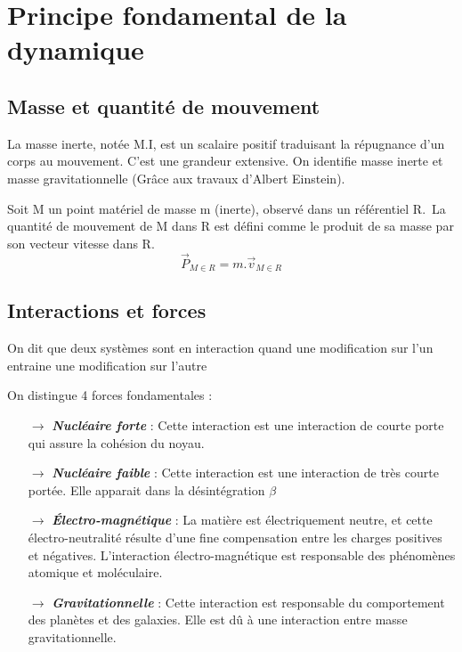 \chapter{Principe fondamental de la dynamique}

\section{Masse et quantité de mouvement}

\begin{de}
La masse inerte, notée M.I, est un scalaire positif traduisant la répugnance d'un corps au mouvement.
C'est une grandeur extensive. On identifie masse inerte et masse gravitationnelle (Grâce aux travaux d'Albert Einstein).
\end{de}

\begin{de}
Soit M un point matériel de masse m (inerte), observé dans un référentiel R.\
La quantité de mouvement de M dans R est défini comme le produit de sa masse par son vecteur vitesse dans R.
$$\vec{P}_{M \in R} = m.\vec{v}_{M \in R}$$
\end{de}

\section{Interactions et forces}

\begin{de}
 On dit que deux systèmes sont en interaction quand une modification sur l'un entraine une modification sur l'autre
\end{de}

On distingue 4 forces fondamentales :
\begin{itemize}
 \item[$\rightarrow$] \textbf{\textit{Nucléaire forte}} : Cette interaction est une interaction de courte porte qui assure la cohésion du noyau.
 \item[$\rightarrow$] \textbf{\textit{Nucléaire faible}} : Cette interaction est une interaction de très courte portée. Elle apparait dans la désintégration $\beta$
 \item[$\rightarrow$]\textit{\textbf{\'Electro-magnétique}} : La matière est électriquement neutre, et cette électro-neutralité résulte d'une fine compensation entre les charges positives et négatives. L'interaction électro-magnétique est responsable des phénomènes atomique et moléculaire.
 \item[$\rightarrow$] \textit{\textbf{Gravitationnelle}} : Cette interaction est responsable du comportement des planètes et des galaxies. Elle est dû à une interaction entre masse gravitationnelle.
\end{itemize}

